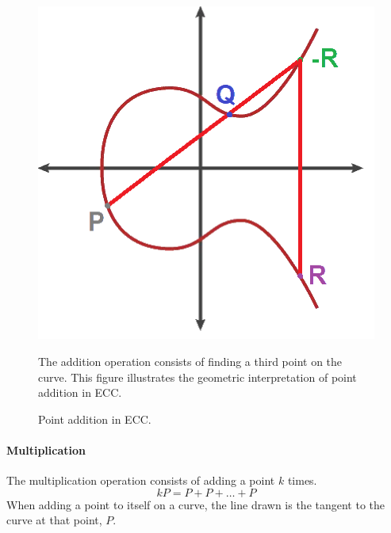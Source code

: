 \begin{figure}[H]
\begin{minipage}{0.5\textwidth}
  \centering
  \includegraphics[width=\linewidth]{images/point_addition.png}
  \caption{Point addition in ECC.}
  \label{fig:point addition in ECC}
\end{minipage}%
\begin{minipage}{0.5\textwidth}
The addition operation consists of finding a third point on the curve. This figure illustrates the geometric interpretation of point addition in ECC.
\end{minipage}
\end{figure}

\paragraph{Multiplication}
The multiplication operation consists of adding a point $k$ times.
\begin{equation}
kP = P + P + \ldots + P 
\end{equation}
When adding a point to itself on a curve, the line drawn is the tangent to the curve at that point, $P$.

